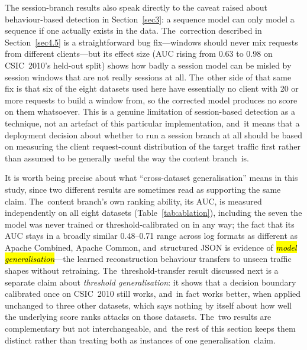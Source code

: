 \documentclass[futureinternet,article,accept,moreauthors]{Definitions/mdpi}
\begin{document}
The session-branch results also speak directly to the caveat raised about behaviour-based detection in Section~\ref{sec3}: a sequence model can only model a sequence if one actually exists in the data. The~correction described in Section~\ref{sec4.5} is a straightforward bug fix---windows should never mix requests from different clients---but its effect size (AUC rising from 0.63 to 0.98 on CSIC~2010's held-out split) shows how badly a session model can be misled by session windows that are not really sessions at all. The~other side of that same fix is that six of the eight datasets used here have essentially no client with 20 or more requests to build a window from, so the corrected model produces no score on them whatsoever. This is a genuine limitation of session-based detection as a technique, not an artefact of this particular implementation, and~it means that a deployment decision about whether to run a session branch at all should be based on measuring the client request-count distribution of the target traffic first rather than assumed to be generally useful the way the content branch~is.

It is worth being precise about what ``cross-dataset generalisation'' means in this study, since two different results are sometimes read as supporting the same claim. The~content branch's own ranking ability, its AUC, is measured independently on all eight datasets (Table~\ref{tab:ablation}), including the seven the model was never trained or threshold-calibrated on in any way; the fact that its AUC stays in a broadly similar 0.48--0.71 range across log formats as different as Apache Combined, Apache Common, and~structured JSON is evidence of \emph{\hl{model generalisation}}---the learned reconstruction behaviour transfers to unseen traffic shapes without retraining. The~threshold-transfer result discussed next is a separate claim about \emph{threshold generalisation}: it shows that a decision boundary calibrated once on CSIC~2010 still works, and~in fact works better, when applied unchanged to three other datasets, which says nothing by itself about how well the underlying score ranks attacks on those datasets. The~two results are complementary but not interchangeable, and~the rest of this section keeps them distinct rather than treating both as instances of one generalisation~claim.
\end{document}
